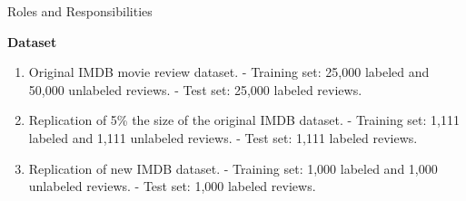 \documentclass[aspectratio=169,xcolor=dvipsnames]{beamer}
\begin{document}

\begin{frame}{Roles and Responsibilities }
    \tableofcontents

    \textbf{Dataset}
    \begin{enumerate}
        \item Original IMDB  movie review dataset.\break 
            - Training set: 25,000 labeled and 50,000 unlabeled reviews.\break 
            - Test set: 25,000 labeled reviews.\break
            
         \item  Replication of 5\% the size of the original IMDB dataset.\break 
            - Training set: 1,111 labeled and 1,111 unlabeled reviews.\break 
            - Test set: 1,111 labeled reviews.\break
            
        \item Replication of new IMDB dataset.\break 
            - Training set: 1,000 labeled and 1,000 unlabeled reviews.\break 
            - Test set: 1,000 labeled reviews.\break
        \end{enumerate}
\end{frame}



\end{document}
